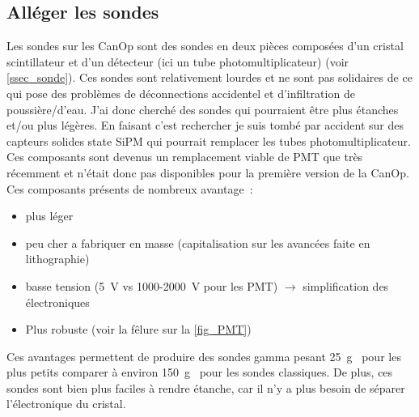 \subsection{Alléger les sondes}
Les sondes sur les CanOp sont des sondes en deux pièces composées d'un cristal scintillateur et d'un détecteur (ici un tube photomultiplicateur) (voir \cref{ssec_sonde}). Ces sondes sont relativement lourdes et ne sont pas solidaires de ce qui pose des problèmes de déconnections accidentel et d'infiltration de poussière/d'eau. %
J'ai donc cherché des sondes qui pourraient être plus étanches et/ou plus légères. En faisant c'est rechercher je suis tombé par accident sur des capteurs solides state SiPM qui pourrait remplacer les tubes photomultiplicateur. Ces composants sont devenus un remplacement viable de PMT que très récemment et n'était donc pas disponibles pour la première version de la CanOp. Ces composants présents de nombreux avantage~:
\begin{itemize}
    \item plus léger
    \item peu cher a fabriquer en masse (capitalisation sur les avancées faite en lithographie)
    \item basse tension (5~V vs 1000-2000~V pour les PMT) $\rightarrow$ simplification des électroniques
    \item Plus robuste (voir la fêlure sur la \cref{fig_PMT})
\end{itemize}

Ces avantages permettent de produire des sondes gamma pesant 25~g~\cite{} pour les plus petits comparer à environ 150~g~\cite{} pour les sondes classiques. De plus, ces sondes sont bien plus faciles à rendre étanche, car il n'y a plus besoin de séparer l'électronique du cristal.
